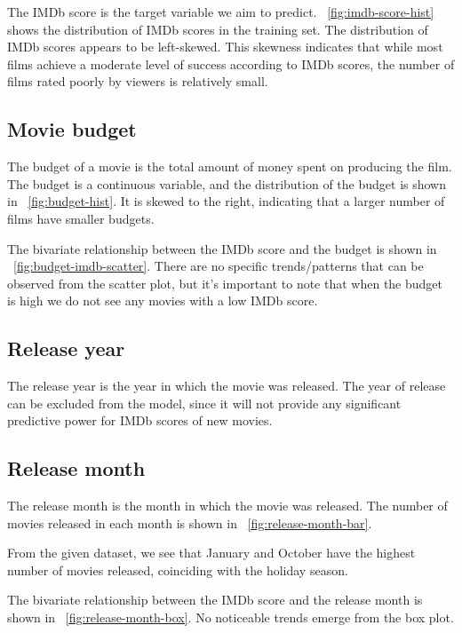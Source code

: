 \documentclass[12pt,a4paper]{article}
\begin{document}
The IMDb score is the target variable we aim to predict.
\figurename~\ref{fig:imdb-score-hist} shows the distribution of IMDb scores in the training set.
The distribution of IMDb scores appears to be left-skewed.
This skewness indicates that while most films achieve a moderate level of success according to IMDb scores, the number of films rated poorly by viewers is relatively small.

\subsection{Movie budget}\label{subsec:budget}

The budget of a movie is the total amount of money spent on producing the film.
The budget is a continuous variable, and the distribution of the budget is shown in \figurename~\ref{fig:budget-hist}.
It is skewed to the right, indicating that a larger number of films have smaller budgets.

The bivariate relationship between the IMDb score and the budget is shown in \figurename~\ref{fig:budget-imdb-scatter}.
There are no specific trends/patterns that can be observed from the scatter plot, but it's important to note that when the budget is high we do not see any movies with a low IMDb score.

\subsection{Release year}\label{subsec:release-year}
The release year is the year in which the movie was released.
The year of release can be excluded from the model, since it will not provide any significant predictive power for IMDb scores of new movies.

\subsection{Release month}\label{subsec:release-month}
The release month is the month in which the movie was released.
The number of movies released in each month is shown in \figurename~\ref{fig:release-month-bar}.

From the given dataset, we see that January and October have the highest number of movies released, coinciding with the holiday season.

The bivariate relationship between the IMDb score and the release month is shown in \figurename~\ref{fig:release-month-box}.
No noticeable trends emerge from the box plot.
\end{document}
